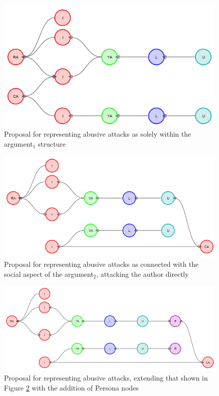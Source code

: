 \begin{figure}
\centering
\includegraphics[scale=\scaleProps]{./figures/cmna_proposals/abuse1.png}
\caption{Proposal for representing abusive attacks as solely within the argument$_1$ structure}
\label{figure:cmna:abuse1}
\end{figure}

\begin{figure}
\centering
\includegraphics[scale=\scaleProps]{./figures/cmna_proposals/abuse2.png}
\caption{Proposal for representing abusive attacks as connected with the social aspect of the argument$_2$, attacking the author directly}
\label{figure:cmna:abuse2}
\end{figure}

\begin{figure}
\centering
\includegraphics[scale=\scaleProps]{./figures/cmna_proposals/abuse3.png}
\caption{Proposal for representing abusive attacks, extending that shown in Figure \ref{figure:cmna:abuse2} with the addition of Persona nodes}
\label{figure:cmna:abuse3}
\end{figure}

